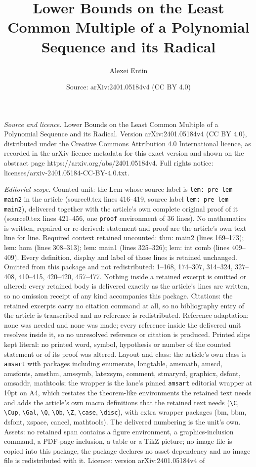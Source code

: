 \documentclass[10pt,a4paper]{amsart}
\title[Lower Bounds on the Least Common Multiple of a Polynomial Se]{Lower Bounds on the Least Common Multiple of a Polynomial Sequence and its Radical}
\author{Alexei Entin}
\date{Source: arXiv:2401.05184v4 (CC BY 4.0)}
\begin{document}
\maketitle

\noindent\emph{Source and licence.} Lower Bounds on the Least Common Multiple of a Polynomial Sequence and its Radical. Version arXiv:2401.05184v4 (CC BY 4.0), distributed under the Creative Commons Attribution 4.0 International licence, as recorded in the arXiv licence metadata for this exact version and shown on the abstract page https://arxiv.org/abs/2401.05184v4. Full rights notice: licenses/arxiv-2401.05184-CC-BY-4.0.txt.\par\smallskip

\noindent\textit{Editorial scope.} Counted unit: the Lem whose source label is \texttt{lem: pre lem main2} in the article (source0.tex lines 416--419, source label \texttt{lem: pre lem main2}), delivered together with the article's own complete original proof of it (source0.tex lines 421--456, one \texttt{proof} environment of 36 lines). No mathematics is written, repaired or re-derived: statement and proof are the article's own text line for line. Required context retained uncounted: thm: main2 (lines 169--173); lem: hom (lines 308--313); lem: main1 (lines 325--326); lem: int comb (lines 409--409). Every definition, display and label of those lines is retained unchanged. Omitted from this package and not redistributed: 1--168, 174--307, 314--324, 327--408, 410--415, 420--420, 457--477. Nothing inside a retained excerpt is omitted or altered: every retained body is delivered exactly as the article's lines are written, so no omission receipt of any kind accompanies this package. Citations: the retained excerpts carry no citation command at all, so no bibliography entry of the article is transcribed and no reference is redistributed. Reference adaptation: none was needed and none was made; every reference inside the delivered unit resolves inside it, so no unresolved reference or citation is produced. Printed slips kept literal: no printed word, symbol, hypothesis or number of the counted statement or of its proof was altered. Layout and class: the article's own class is \texttt{amsart} with packages including enumerate, longtable, amsmath, amscd, amsfonts, amsthm, amssymb, latexsym, comment, stmaryrd, graphicx, dsfont, amsaddr, mathtools; the wrapper is the lane's pinned \texttt{amsart} editorial wrapper at 10pt on A4, which restates the theorem-like environments the retained text needs and adds the article's own macro definitions that the retained text needs (\texttt{\textbackslash C}, \texttt{\textbackslash Cup}, \texttt{\textbackslash Gal}, \texttt{\textbackslash Q}, \texttt{\textbackslash Qb}, \texttt{\textbackslash Z}, \texttt{\textbackslash case}, \texttt{\textbackslash disc}), with extra wrapper packages (bm, bbm, dsfont, xspace, cancel, mathtools). The delivered numbering is the unit's own. Assets: no retained span contains a figure environment, a graphics-inclusion command, a PDF-page inclusion, a table or a TikZ picture; no image file is copied into this package, the package declares no asset dependency and no image file is redistributed with it. Licence: version arXiv:2401.05184v4 of 
\end{document}
